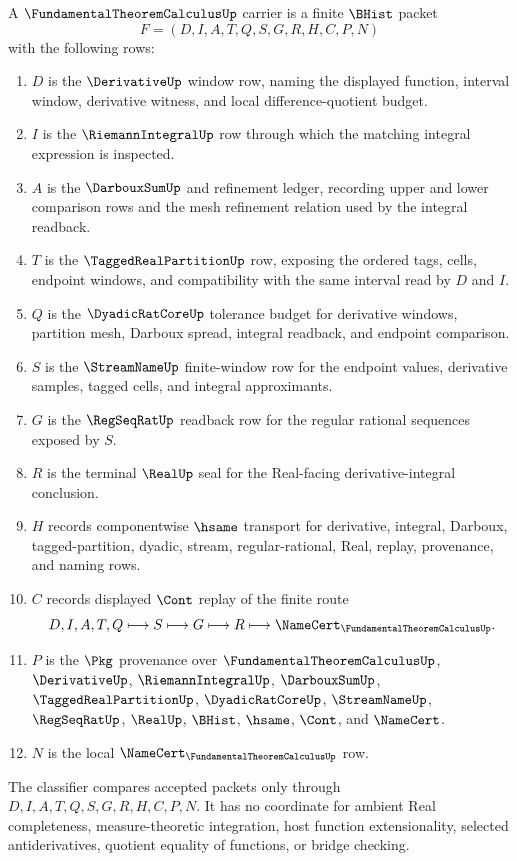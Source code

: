 \begin{definition}
\label{def:fundamental-theorem-calculus-carrier}
A $\FundamentalTheoremCalculusUp$ carrier is a finite $\BHist$ packet
$$
F=(D,I,A,T,Q,S,G,R,H,C,P,N)
$$
with the following rows:
\begin{enumerate}
\item $D$ is the $\DerivativeUp$ window row, naming the displayed function, interval window, derivative witness, and local difference-quotient budget.
\item $I$ is the $\RiemannIntegralUp$ row through which the matching integral expression is inspected.
\item $A$ is the $\DarbouxSumUp$ and refinement ledger, recording upper and lower comparison rows and the mesh refinement relation used by the integral readback.
\item $T$ is the $\TaggedRealPartitionUp$ row, exposing the ordered tags, cells, endpoint windows, and compatibility with the same interval read by $D$ and $I$.
\item $Q$ is the $\DyadicRatCoreUp$ tolerance budget for derivative windows, partition mesh, Darboux spread, integral readback, and endpoint comparison.
\item $S$ is the $\StreamNameUp$ finite-window row for the endpoint values, derivative samples, tagged cells, and integral approximants.
\item $G$ is the $\RegSeqRatUp$ readback row for the regular rational sequences exposed by $S$.
\item $R$ is the terminal $\RealUp$ seal for the Real-facing derivative-integral conclusion.
\item $H$ records componentwise $\hsame$ transport for derivative, integral, Darboux, tagged-partition, dyadic, stream, regular-rational, Real, replay, provenance, and naming rows.
\item $C$ records displayed $\Cont$ replay of the finite route
$$
D,I,A,T,Q \longmapsto S \longmapsto G \longmapsto R \longmapsto \NameCert_{\FundamentalTheoremCalculusUp}.
$$
\item $P$ is the $\Pkg$ provenance over $\FundamentalTheoremCalculusUp$, $\DerivativeUp$, $\RiemannIntegralUp$, $\DarbouxSumUp$, $\TaggedRealPartitionUp$, $\DyadicRatCoreUp$, $\StreamNameUp$, $\RegSeqRatUp$, $\RealUp$, $\BHist$, $\hsame$, $\Cont$, and $\NameCert$.
\item $N$ is the local $\NameCert_{\FundamentalTheoremCalculusUp}$ row.
\end{enumerate}
The classifier compares accepted packets only through $D,I,A,T,Q,S,G,R,H,C,P,N$. It has no coordinate for ambient Real completeness, measure-theoretic integration, host function extensionality, selected antiderivatives, quotient equality of functions, or bridge checking.
\end{definition}

